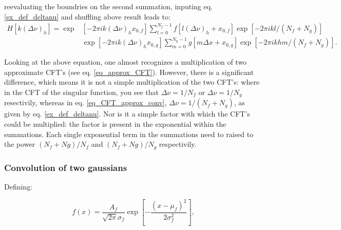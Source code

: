 reevaluating the boundries on the second summation, inputing eq. \eqref{ex_def_deltanu} and shuffling above result leads to:
\begin{equation}\label{eq_CFT_approx_conv}
\begin{aligned}
H[k(\Delta\nu)_h] = \operatorname{exp}&[-2\pi i k(\Delta\nu)_h x_{0,f}] \sum_{l=0}^{N_f-1} f[l(\Delta\nu)_h + x_{0,f}]\operatorname{exp}[-2\pi i k l/(N_f+N_g)] \\
& \operatorname{exp}[-2\pi i k(\Delta\nu)_h x_{0,g}]  \sum_{m=0}^{N_g-1}g[m\Delta x + x_{0,g}] \operatorname{exp}[-2\pi i kh m/(N_f+N_g)].
\end{aligned}
\end{equation}

Looking at the above equation, one almost recognizes a multiplication of two approximate CFT's (see eq. \eqref{eq_approx_CFT}). However, there is a significant difference, which means it is not a simple multiplication of the two CFT's: where in the CFT of the singular function, you see that $\Delta\nu = 1/N_f$ or $\Delta\nu = 1/N_g$ resectivily, whereas in eq. \eqref{eq_CFT_approx_conv}, $\Delta\nu = 1/(N_f + N_g)$, as given by eq. \eqref{ex_def_deltanu}. Nor is it a simple factor with which the CFT's could be multiplied: the factor is present in the exponential within the summations. Each single exponential term in the summations need to raised to the power $(N_f+Ng)/N_f$ and $(N_f+Ng)/N_g$ respectivily.%







\subsubsection{Convolution of two gaussians}
Defining:

\begin{equation}\label{eq_def_gauss}
f(x)=\frac{A_{f}}{\sqrt{2\pi}\sigma_f} \exp{\left[-\frac{\left(x-\mu_{f}\right)^{2}}{2 \sigma_{f}^{2}}\right]},
\end{equation}

